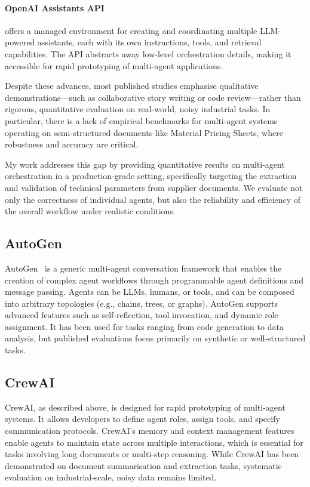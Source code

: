 \paragraph{OpenAI Assistants API} offers a managed environment for creating and coordinating multiple LLM-powered assistants, each with its own instructions, tools, and retrieval capabilities. The API abstracts away low-level orchestration details, making it accessible for rapid prototyping of multi-agent applications.

Despite these advances, most published studies emphasise qualitative demonstrations—such as collaborative story writing or code review—rather than rigorous, quantitative evaluation on real-world, noisy industrial tasks. In particular, there is a lack of empirical benchmarks for multi-agent systems operating on semi-structured documents like Material Pricing Sheets, where robustness and accuracy are critical.

My work addresses this gap by providing quantitative results on multi-agent orchestration in a production-grade setting, specifically targeting the extraction and validation of technical parameters from supplier documents. We evaluate not only the correctness of individual agents, but also the reliability and efficiency of the overall workflow under realistic conditions.

\subsection{AutoGen}
AutoGen~\cite{wu2023autogen} is a generic multi-agent conversation framework that enables the creation of complex agent workflows through programmable agent definitions and message passing. Agents can be LLMs, humans, or tools, and can be composed into arbitrary topologies (e.g., chains, trees, or graphs). AutoGen supports advanced features such as self-reflection, tool invocation, and dynamic role assignment. It has been used for tasks ranging from code generation to data analysis, but published evaluations focus primarily on synthetic or well-structured tasks.

\subsection{CrewAI}
CrewAI, as described above, is designed for rapid prototyping of multi-agent systems. It allows developers to define agent roles, assign tools, and specify communication protocols. CrewAI's memory and context management features enable agents to maintain state across multiple interactions, which is essential for tasks involving long documents or multi-step reasoning. While CrewAI has been demonstrated on document summarisation and extraction tasks, systematic evaluation on industrial-scale, noisy data remains limited.

